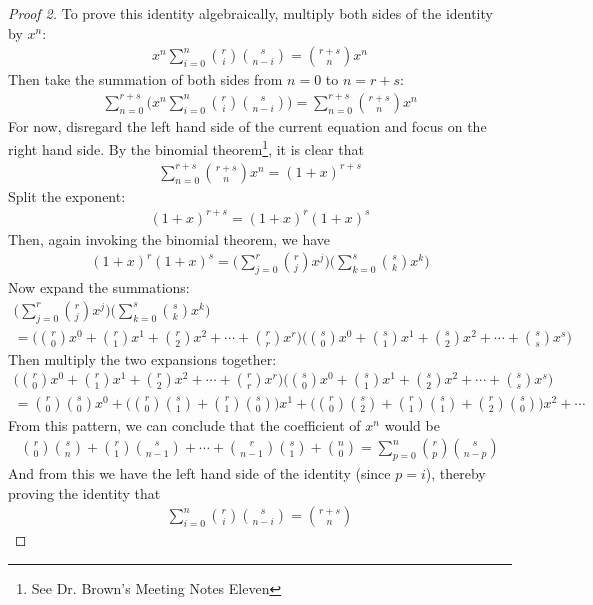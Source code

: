\documentclass[12pt]{article}
\newcommand{\ds}{\displaystyle}
\begin{document}
\begin{proof}[Proof 2]
To prove this identity algebraically, multiply both sides of the identity by $x^n$:
\begin{eqnarray}
x^n\sum_{i = 0}^n \binom{r}{i}\binom{s}{n-i} = \binom{r+s}{n}x^n \nonumber
\end{eqnarray}
Then take the summation of both sides from $n=0$ to $n=r+s$:
\begin{eqnarray}
\sum_{n=0}^{r+s}\Bigg( x^n\sum_{i = 0}^n \binom{r}{i}\binom{s}{n-i} \Bigg) = \sum_{n=0}^{r+s}\binom{r+s}{n}x^n \nonumber
\end{eqnarray}
For now, disregard the left hand side of the current equation and focus on the right hand side. By the binomial theorem\footnote{See Dr. Brown's Meeting Notes Eleven}, it is clear that
\begin{eqnarray}
\sum_{n=0}^{r+s}\binom{r+s}{n}x^n = (1+x)^{r+s} \nonumber
\end{eqnarray}
Split the exponent:
\begin{eqnarray}
(1+x)^{r+s}=(1+x)^r (1+x)^s \nonumber
\end{eqnarray}
Then, again invoking the binomial theorem, we have
\begin{eqnarray}
(1+x)^r (1+x)^s = \Bigg(\sum_{j=0}^r \binom{r}{j}x^j \Bigg) \Bigg(\sum_{k=0}^s \binom{s}{k}x^k \Bigg) \nonumber
\end{eqnarray}
Now expand the summations:
\begin{multline}
\Bigg(\sum_{j=0}^r \binom{r}{j}x^j \Bigg) \Bigg(\sum_{k=0}^s \binom{s}{k}x^k \Bigg) \\ =  \Bigg( \binom{r}{0}x^0+\binom{r}{1}x^1+\binom{r}{2}x^2+\cdots+\binom{r}{r}x^r \Bigg) \Bigg( \binom{s}{0}x^0+\binom{s}{1}x^1+\binom{s}{2}x^2+\cdots+\binom{s}{s}x^s \Bigg) \nonumber
\end{multline}
Then multiply the two expansions together:
\begin{multline}
\Bigg( \binom{r}{0}x^0+\binom{r}{1}x^1+\binom{r}{2}x^2+\cdots+\binom{r}{r}x^r \Bigg) \Bigg( \binom{s}{0}x^0+\binom{s}{1}x^1+\binom{s}{2}x^2+\cdots+\binom{s}{s}x^s \Bigg) \\ = \binom{r}{0}\binom{s}{0}x^0 + \Bigg( \binom{r}{0}\binom{s}{1} + \binom{r}{1}\binom{s}{0}\Bigg)x^1 + \Bigg(\binom{r}{0}\binom{s}{2}+\binom{r}{1}\binom{s}{1}+\binom{r}{2}\binom{s}{0} \Bigg)x^2 + \cdots \nonumber
\end{multline}
From this pattern, we can conclude that the coefficient of $x^n$ would be
\begin{eqnarray}
\binom{r}{0}\binom{s}{n}+\binom{r}{1}\binom{s}{n-1}+\cdots+\binom{r}{n-1}\binom{s}{1}+\binom{n}{0}=\sum_{p=0}^n \binom{r}{p}\binom{s}{n-p} \nonumber
\end{eqnarray}
And from this we have the left hand side of the identity (since $p=i$), thereby proving the identity that
\begin{eqnarray} \ds \sum_{i = 0}^n \binom{r}{i}\binom{s}{n-i} = \binom{r+s}{n} \label{Vandermonde} \nonumber \end{eqnarray}
\end{proof}
\end{document}
